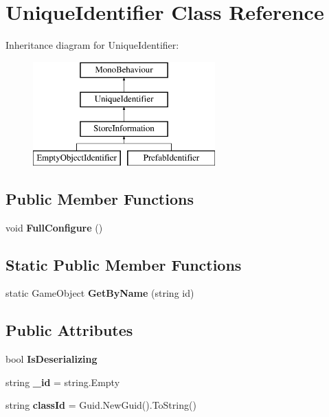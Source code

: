 \hypertarget{class_unique_identifier}{}\section{Unique\+Identifier Class Reference}
\label{class_unique_identifier}
Inheritance diagram for Unique\+Identifier\+:\begin{figure}[H]
\begin{center}
\leavevmode
\includegraphics[height=4.000000cm]{class_unique_identifier}
\end{center}
\end{figure}
\subsection*{Public Member Functions}
\begin{DoxyCompactItemize}
\item 
\mbox{\label{class_unique_identifier_a7508486be3a08da62e2cca4380a4831e}} 
void {\bfseries Full\+Configure} ()
\end{DoxyCompactItemize}
\subsection*{Static Public Member Functions}
\begin{DoxyCompactItemize}
\item 
\mbox{\label{class_unique_identifier_ac1d6be2c8446c7cfa55fa8ceee56d6c8}} 
static Game\+Object {\bfseries Get\+By\+Name} (string id)
\end{DoxyCompactItemize}
\subsection*{Public Attributes}
\begin{DoxyCompactItemize}
\item 
\mbox{\label{class_unique_identifier_ab2083a6b69758c86580f1e39f6ee244d}} 
bool {\bfseries Is\+Deserializing}
\item 
\mbox{\label{class_unique_identifier_a45f29fa697aa1c07e00c73253386da28}} 
string {\bfseries \+\_\+id} = string.\+Empty
\item 
\mbox{\label{class_unique_identifier_afb16f89a7bcd6aad41cd4be05377425d}} 
string {\bfseries class\+Id} = Guid.\+New\+Guid().To\+String()
\end{DoxyCompactItemize}
